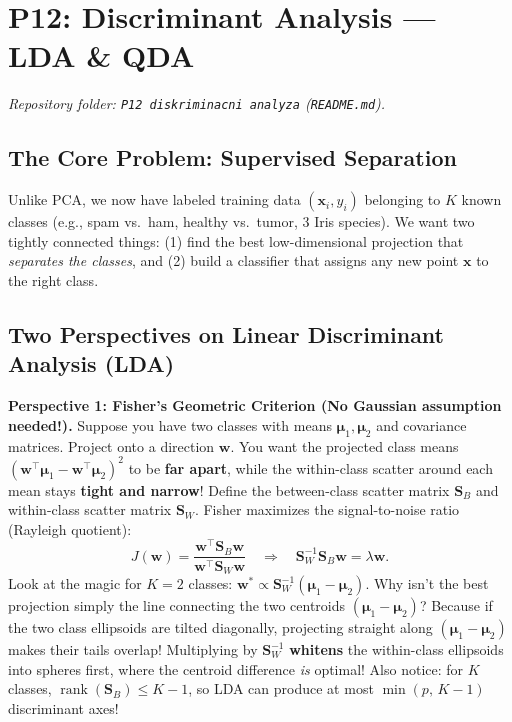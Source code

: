 \documentclass[11pt, a4paper]{article}
\begin{document}
\section{P12: Discriminant Analysis --- LDA \& QDA}
\emph{Repository folder: \texttt{P12 diskriminacni analyza} (\texttt{README.md}).}

\subsection{The Core Problem: Supervised Separation}
Unlike PCA, we now have labeled training data $(\mathbf{x}_i, y_i)$ belonging to $K$ known classes (e.g., spam vs.\ ham, healthy vs.\ tumor, 3 Iris species). We want two tightly connected things: (1) find the best low-dimensional projection that \emph{separates the classes}, and (2) build a classifier that assigns any new point $\mathbf{x}$ to the right class.

\subsection{Two Perspectives on Linear Discriminant Analysis (LDA)}

\textbf{Perspective 1: Fisher's Geometric Criterion (No Gaussian assumption needed!).}
Suppose you have two classes with means $\boldsymbol{\mu}_1, \boldsymbol{\mu}_2$ and covariance matrices. Project onto a direction $\mathbf{w}$. You want the projected class means $(\mathbf{w}^\top\boldsymbol{\mu}_1 - \mathbf{w}^\top\boldsymbol{\mu}_2)^2$ to be \textbf{far apart}, while the within-class scatter around each mean stays \textbf{tight and narrow}!
Define the between-class scatter matrix $\mathbf{S}_B$ and within-class scatter matrix $\mathbf{S}_W$. Fisher maximizes the signal-to-noise ratio (Rayleigh quotient):
\[
    J(\mathbf{w}) = \frac{\mathbf{w}^\top \mathbf{S}_B \mathbf{w}}{\mathbf{w}^\top \mathbf{S}_W \mathbf{w}}
    \quad \Longrightarrow \quad
    \mathbf{S}_W^{-1} \mathbf{S}_B \mathbf{w} = \lambda \mathbf{w}.
\]
Look at the magic for $K=2$ classes: $\mathbf{w}^* \propto \mathbf{S}_W^{-1}(\boldsymbol{\mu}_1 - \boldsymbol{\mu}_2)$. Why isn't the best projection simply the line connecting the two centroids $(\boldsymbol{\mu}_1 - \boldsymbol{\mu}_2)$? Because if the two class ellipsoids are tilted diagonally, projecting straight along $(\boldsymbol{\mu}_1 - \boldsymbol{\mu}_2)$ makes their tails overlap! Multiplying by $\mathbf{S}_W^{-1}$ \textbf{whitens} the within-class ellipsoids into spheres first, where the centroid difference \emph{is} optimal! Also notice: for $K$ classes, $\operatorname{rank}(\mathbf{S}_B) \le K - 1$, so LDA can produce at most $\min(p,\, K-1)$ discriminant axes!
\end{document}
